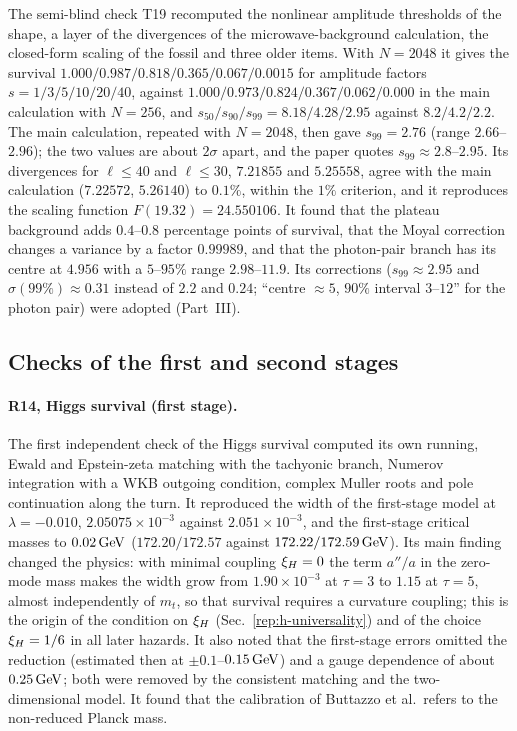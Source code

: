 The semi-blind check T19 recomputed the nonlinear amplitude thresholds of the shape, a layer of the divergences of the microwave-background calculation, the closed-form scaling of the fossil and three older items.
With $N=2048$ it gives the survival $1.000/\allowbreak 0.987/\allowbreak 0.818/\allowbreak 0.365/\allowbreak 0.067/\allowbreak 0.0015$ for amplitude factors $s=1/3/5/10/20/40$, against $1.000/\allowbreak 0.973/\allowbreak 0.824/\allowbreak 0.367/\allowbreak 0.062/\allowbreak 0.000$ in the main calculation with $N=256$, and $s_{50}/s_{90}/s_{99}=8.18/\allowbreak 4.28/\allowbreak 2.95$ against $8.2/\allowbreak 4.2/\allowbreak 2.2$. %
The main calculation, repeated with $N=2048$, then gave $s_{99}=2.76$ (range $2.66$--$2.96$); the two values are about $2\sigma$ apart, and the paper quotes $s_{99}\approx2.8$--$2.95$. %
Its divergences for $\ell\le40$ and $\ell\le30$, $7.21855$ and $5.25558$, agree with the main calculation ($7.22572$, $5.26140$) to $0.1\%$, within the $1\%$ criterion, and it reproduces the scaling function $F(19.32)=24.550106$. %
It found that the plateau background adds $0.4$--$0.8$ percentage points of survival, that the Moyal correction changes a variance by a factor $0.99989$, and that the photon-pair branch has its centre at $4.956$ with a $5$--$95\%$ range $2.98$--$11.9$. %
Its corrections ($s_{99}\approx2.95$ and $\sigma(99\%)\approx0.31$ instead of $2.2$ and $0.24$; ``centre $\approx5$, $90\%$ interval $3$--$12$'' for the photon pair) were adopted (Part~III).

\subsection{Checks of the first and second stages}\label{sec:v19-early}

\paragraph{R14, Higgs survival (first stage).}
The first independent check of the Higgs survival computed its own running, Ewald and Epstein-zeta matching with the tachyonic branch, Numerov integration with a WKB outgoing condition, complex Muller roots and pole continuation along the turn.
It reproduced the width of the first-stage model at $\lambda=-0.010$, $2.05075\times10^{-3}$ against $2.051\times10^{-3}$, and the first-stage critical masses to $0.02\,\mathrm{GeV}$ ($172.20/\allowbreak 172.57$ against $172.22/\allowbreak 172.59\,\mathrm{GeV}$). %
Its main finding changed the physics: with minimal coupling $\xi_H=0$ the term $a''/a$ in the zero-mode mass makes the width grow from $1.90\times10^{-3}$ at $\tau=3$ to $1.15$ at $\tau=5$, almost independently of $m_t$, so that survival requires a curvature coupling; this is the origin of the condition on $\xi_H$ (Sec.~\ref{rep:h-universality}) and of the choice $\xi_H=1/6$ in all later hazards. %
It also noted that the first-stage errors omitted the reduction (estimated then at $\pm0.1$--$0.15\,\mathrm{GeV}$) and a gauge dependence of about $0.25\,\mathrm{GeV}$; both were removed by the consistent matching and the two-dimensional model.
It found that the calibration of Buttazzo et al.\ refers to the non-reduced Planck mass.

